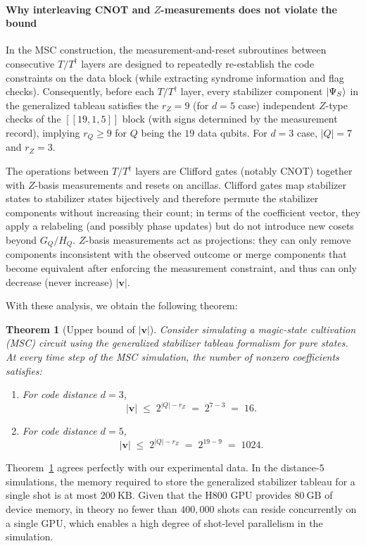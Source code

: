 \documentclass[10pt,conference]{IEEEtran}
\newtheorem{theorem}{Theorem}
\begin{document}
\paragraph{Why interleaving CNOT and $Z$-measurements does not violate the bound}
In the MSC construction, the measurement-and-reset subroutines between consecutive $T/T^\dagger$ layers are designed to repeatedly re-establish the code constraints on the data block (while extracting syndrome information and flag checks).
Consequently, before each $T/T^\dagger$ layer, every stabilizer component $\ket{\Psi_S}$ in the generalized tableau satisfies the $r_Z=9$ (for $d=5$ case) independent $Z$-type checks of the $[[19,1,5]]$ block (with signs determined by the measurement record), implying $r_Q \ge 9$ for $Q$ being the $19$ data qubits. For $d=3$ case, $|Q|=7$ and $r_Z = 3$.

The operations between $T/T^\dagger$ layers are Clifford gates (notably CNOT) together with $Z$-basis measurements and resets on ancillas.
Clifford gates map stabilizer states to stabilizer states bijectively and therefore permute the stabilizer components without increasing their count; in terms of the coefficient vector, they apply a relabeling (and possibly phase updates) but do not introduce new cosets beyond $G_Q/H_Q$.
$Z$-basis measurements act as projections: they can only remove components inconsistent with the observed outcome or merge components that become equivalent after enforcing the measurement constraint, and thus can only decrease (never increase) $|\mathbf{v}|$.

With these analysis, we obtain the following theorem:
\begin{theorem}[Upper bound of $|\mathbf{v}|$]\label{thm:coff_upper_bound}
    Consider simulating a magic-state cultivation (MSC) circuit using the generalized stabilizer tableau formalism for pure states. At every time step of the MSC simulation, the number of nonzero coefficients satisfies:
\begin{enumerate}
    \item {For code distance $d=3$,} 
    \[
    |\mathbf{v}| \;\le\; 2^{|Q|-r_Z} \;=\; 2^{7-3} \;=\; 16.
    \]
    \item {For code distance $d=5$,}
    \[
    |\mathbf{v}| \;\le\; 2^{|Q|-r_Z} \;=\; 2^{19-9} \;=\; 1024.
    \]
\end{enumerate}
\end{theorem}

Theorem~\ref{thm:coff_upper_bound} agrees perfectly with our experimental data.
In the distance-$5$ simulations, the memory required to store the generalized stabilizer tableau for a single shot is at most $200~\mathrm{KB}$.
Given that the H800 GPU provides $80~\mathrm{GB}$ of device memory, in theory no fewer than $400{,}000$ shots can reside concurrently on a single GPU, which enables a high degree of shot-level parallelism in the simulation.
\end{document}
